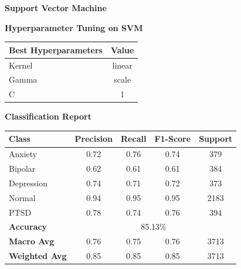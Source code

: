 \pagebreak

\vspace{1.5em}
\noindent
\textbf{Support Vector Machine}
\begin{center}
    \textbf{Hyperparameter Tuning on SVM} \\[0.5em]
    \begin{tabular}{|l|c|}
        \hline
        \textbf{Best Hyperparameters}  & \textbf{Value} \\ \hline
        Kernel                        & linear         \\ \hline
        Gamma                         & scale          \\ \hline
        C                              & 1              \\ \hline
    \end{tabular}
\end{center}

\begin{center}
    \textbf{Classification Report} \\[0.5em]
    \begin{tabular}{|l|c|c|c|c|}
        \hline
        \textbf{Class} & \textbf{Precision} & \textbf{Recall} & \textbf{F1-Score} & \textbf{Support} \\ \hline
        Anxiety        & 0.72               & 0.76            & 0.74              & 379             \\ \hline
        Bipolar        & 0.62               & 0.61            & 0.61              & 384             \\ \hline
        Depression     & 0.74               & 0.71            & 0.72              & 373             \\ \hline
        Normal         & 0.94               & 0.95            & 0.95              & 2183            \\ \hline
        PTSD           & 0.78               & 0.74            & 0.76              & 394             \\ \hline
        \textbf{Accuracy} & \multicolumn{4}{|c|}{85.13\%} \\ \hline
        \textbf{Macro Avg} & 0.76            & 0.75            & 0.76              & 3713            \\ \hline
        \textbf{Weighted Avg} & 0.85         & 0.85            & 0.85              & 3713            \\ \hline
    \end{tabular}
\end{center}

